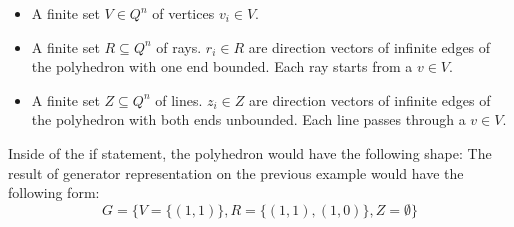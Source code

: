 \begin{itemize}
    \item A finite set $V\in Q^n$ of vertices $v_i \in V$.
    \item A finite set $R \subseteq Q^n$ of rays. $r_i \in R$ are direction vectors of infinite edges of the polyhedron with one end bounded. Each ray starts from a $v \in V$.
    \item  A finite set $Z \subseteq Q^n$ of lines. $z_i \in Z$ are direction vectors of infinite edges of the polyhedron with both ends unbounded. Each line passes through a $v \in V$.
\end{itemize}Inside of the if statement, the polyhedron would have the following shape:
The result of generator representation on the previous example would have the following form: 
\begin{equation}
    G = \{ V = \{(1,1)\}, R = \{(1,1),(1,0) \}, Z = \emptyset \}
\end{equation}
